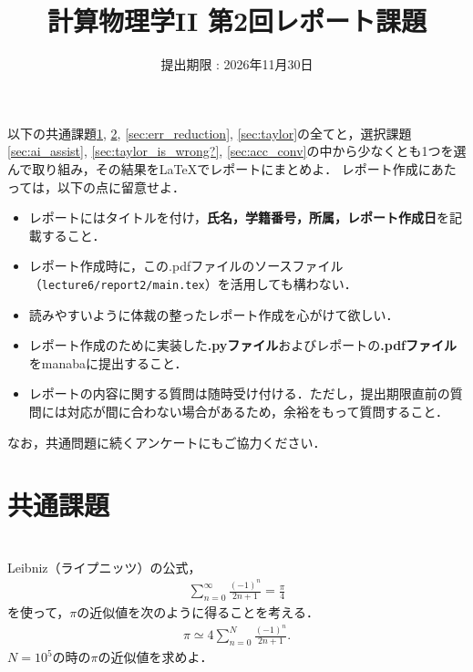 \documentclass[a4paper,12pt]{jsarticle}
\title{計算物理学II 第2回レポート課題}
\date{提出期限 : 2026年11月30日}
\begin{document}
\maketitle

以下の共通課題\ref{sec:leibniz}, \ref{sec:wallis}, \ref{sec:err_reduction}, \ref{sec:taylor}の全てと，選択課題\ref{sec:ai_assist}, \ref{sec:taylor_is_wrong?}, \ref{sec:acc_conv}の中から少なくとも1つを選んで取り組み，その結果を\LaTeX でレポートにまとめよ．
レポート作成にあたっては，以下の点に留意せよ．
\begin{itemize}
    \item レポートにはタイトルを付け，{\bf 氏名，学籍番号，所属，レポート作成日}を記載すること．
    \item レポート作成時に，この.pdfファイルのソースファイル（\texttt{lecture6/report2/main.tex}）を活用しても構わない．
    \item 読みやすいように体裁の整ったレポート作成を心がけて欲しい．
    \item レポート作成のために実装した{\bf .pyファイル}およびレポートの{\bf .pdfファイル}をmanabaに提出すること．
    \item レポートの内容に関する質問は随時受け付ける．ただし，提出期限直前の質問には対応が間に合わない場合があるため，余裕をもって質問すること．
\end{itemize}

なお，共通問題に続くアンケートにもご協力ください．

\section*{共通課題}

\section{}
\label{sec:leibniz}

Leibniz（ライプニッツ）の公式，
\begin{align}
    \sum_{n=0}^{\infty}\frac{(-1)^{n}}{2n+1}
    =
    \frac{\pi}{4}
\end{align}
を使って，$\pi$の近似値を次のように得ることを考える．
\begin{align}
    \pi
    \simeq
    4\sum_{n=0}^{N}\frac{(-1)^{n}}{2n+1}.
\end{align}
$N=10^{5}$の時の$\pi$の近似値を求めよ．


\section{}
\label{sec:wallis}
\end{document}
